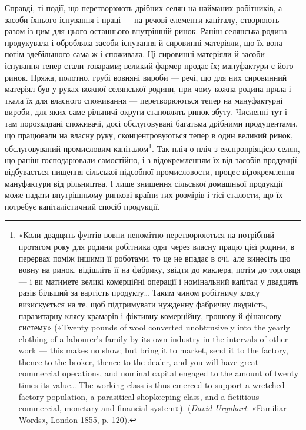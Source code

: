 Справді, ті події, що перетворюють дрібних селян на найманих
робітників, а засоби їхнього існування і праці — на речові
елементи капіталу, створюють разом із цим для цього останнього
внутрішній ринок. Раніш селянська родина продукувала
і обробляла засоби існування й сировинні матеріяли, що їх вона
потім здебільшого сама ж і споживала. Ці сировинні матеріяли
й засоби існування тепер стали товарами; великий фармер продає
їх; мануфактури є його ринок. Пряжа, полотно, грубі вовняні
вироби — речі, що для них сировинний матеріял був у руках
кожної селянської родини, при чому кожна родина пряла і ткала
їх для власного споживання — перетворюються тепер на мануфактурні
вироби, для яких саме рільничі округи становлять
ринок збуту. Численні тут і там порозкидані споживачі, досі
обслуговувані багатьма дрібними продуцентами, що працювали
на власну руку, сконцентровуються тепер в один великий ринок,
обслуговуваний промисловим капіталом\footnote{
«Коли двадцять фунтів вовни непомітно перетворюються на потрібний
протягом року для родини робітника одяг через власну працю
цієї родини, в перервах поміж іншими її роботами, то це не впадає в очі,
але винесіть цю вовну на ринок, відішліть її на фабрику, звідти до маклера,
потім до торговця — і ви матимете великі комерційні операції і
номінальний капітал у двадцять разів більший за вартість продукту\dots{}
Таким чином робітничу клясу визискується на те, щоб підтримувати
нужденну фабричну людність, паразитарну клясу крамарів і фіктивну
комерційну, грошову й фінансову систему» («Twenty pounds of wool
converted unobtrusively into the yearly clothing of a labourer’s family
by its own industry in the intervals of other work — this makes no show;
but bring it to market, send it to the factory, thence to the broker, thence
to the dealer, and you will have great commercial operations, and nominal
capital engaged to the amount of twenty times its value\dots{} The working
class is thus emerced to support a wretched factory population, a parasitical
shopkeeping class, and a fictitious commercial, monetary and financial
system»). (\emph{David Urquhart}: «Familiar Words», London 1855, p. 120).
}. Так пліч-о-пліч
з експропріяцією селян, що раніш господарювали самостійно, і
з відокремленням їх від засобів продукції відбувається нищення
сільської підсобної промисловости, процес відокремлення мануфактури
від рільництва. І лише знищення сільської домашньої
продукції може надати внутрішньому ринкові країни тих розмірів
і тієї сталости, що їх потребує капіталістичний спосіб продукції.

